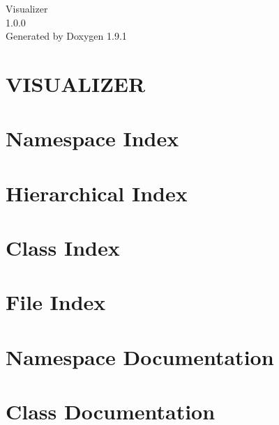 \let\mypdfximage\pdfximage\def\pdfximage{\immediate\mypdfximage}\documentclass[twoside]{book}
\newcommand{\+}{\discretionary{\mbox{\scriptsize$\hookleftarrow$}}{}{}}
\newcommand{\clearemptydoublepage}{%
  \newpage{\pagestyle{empty}\cleardoublepage}%
}
\begin{document}
\raggedbottom

\hypersetup{pageanchor=false,
             bookmarksnumbered=true,
             pdfencoding=unicode
            }
\begin{titlepage}
\vspace*{7cm}
\begin{center}%
{\Large Visualizer \\[1ex]\large 1.\+0.\+0 }\\
\vspace*{1cm}
{\large Generated by Doxygen 1.9.1}\\
\end{center}
\end{titlepage}
\clearemptydoublepage
{}
\tableofcontents
\clearemptydoublepage
{}
\hypersetup{pageanchor=true}

\chapter{VISUALIZER}
\label{index}\hypertarget{index}{}
\chapter{Namespace Index}

\chapter{Hierarchical Index}

\chapter{Class Index}

\chapter{File Index}

\chapter{Namespace Documentation}










\chapter{Class Documentation}



















\end{document}

